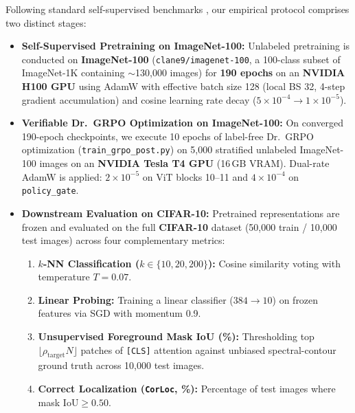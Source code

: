 \documentclass[11pt,a4paper]{article}
\begin{document}
Following standard self-supervised benchmarks \cite{caron2021emerging, tian2020contrastive}, our empirical protocol comprises two distinct stages:
\begin{itemize}[leftmargin=*]
    \item \textbf{Self-Supervised Pretraining on ImageNet-100:} Unlabeled pretraining is conducted on \textbf{ImageNet-100} (\texttt{clane9/imagenet-100}, a 100-class subset of ImageNet-1K \cite{deng2009imagenet} containing $\sim$130,000 images) for \textbf{190 epochs} on an \textbf{NVIDIA H100 GPU} using AdamW \cite{loshchilov2018decoupled} with effective batch size 128 (local BS 32, 4-step gradient accumulation) and cosine learning rate decay ($5\times 10^{-4} \to 1\times 10^{-5}$).
    \item \textbf{Verifiable Dr.\ GRPO Optimization on ImageNet-100:} On converged 190-epoch checkpoints, we execute 10 epochs of label-free Dr.\ GRPO optimization (\texttt{train\_grpo\_post.py}) on 5,000 stratified unlabeled ImageNet-100 images on an \textbf{NVIDIA Tesla T4 GPU} (16\,GB VRAM). Dual-rate AdamW is applied: $2\times 10^{-5}$ on ViT blocks 10--11 and $4\times 10^{-4}$ on \texttt{policy\_gate}.
    \item \textbf{Downstream Evaluation on CIFAR-10:} Pretrained representations are frozen and evaluated on the full \textbf{CIFAR-10} dataset \cite{krizhevsky2009cifar} (50,000 train / 10,000 test images) across four complementary metrics:
    \begin{enumerate}[label=(\alph*)]
        \item \textbf{$k$-NN Classification ($k \in \{10, 20, 200\}$):} Cosine similarity voting with temperature $T=0.07$.
        \item \textbf{Linear Probing:} Training a linear classifier ($384 \to 10$) on frozen features via SGD with momentum 0.9.
        \item \textbf{Unsupervised Foreground Mask IoU (\%):} Thresholding top $\lfloor \rho_{\text{target}} N \rfloor$ patches of \texttt{[CLS]} attention against unbiased spectral-contour ground truth across 10,000 test images.
        \item \textbf{Correct Localization (\texttt{CorLoc}, \%):} Percentage of test images where mask $\text{IoU} \ge 0.50$.
    \end{enumerate}
\end{itemize}
\end{document}
